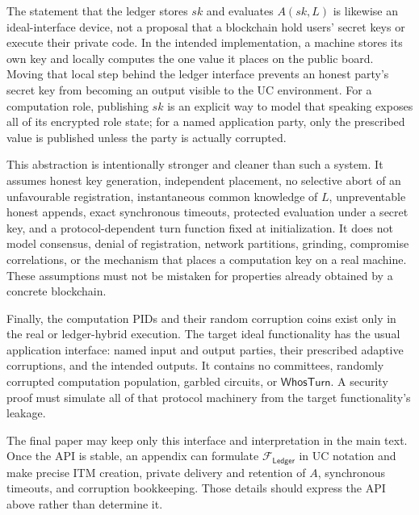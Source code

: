 The statement that the ledger stores $sk$ and evaluates $A(sk,L)$ is likewise
an ideal-interface device, not a proposal that a blockchain hold users' secret
keys or execute their private code. In the intended implementation, a machine
stores its own key and locally computes the one value it places on the public
board. Moving that local step behind the ledger interface prevents an honest
party's secret key from becoming an output visible to the UC environment. For
a computation role, publishing $sk$ is an explicit way to model that speaking
exposes all of its encrypted role state; for a named application party, only
the prescribed value is published unless the party is actually corrupted.

This abstraction is intentionally stronger and cleaner than such a system.
It assumes honest key generation, independent placement, no selective abort
of an unfavourable registration, instantaneous common knowledge of $L$,
unpreventable honest appends, exact synchronous timeouts, protected
evaluation under a secret key, and a protocol-dependent turn function fixed
at initialization. It does not model consensus, denial of registration, network
partitions, grinding, compromise correlations, or the mechanism that places
a computation key on a real machine. These assumptions must not be mistaken
for properties already obtained by a concrete blockchain.

Finally, the computation PIDs and their random corruption coins exist only in
the real or ledger-hybrid execution. The target ideal functionality has the
usual application interface: named input and output parties, their prescribed
adaptive corruptions, and the intended outputs. It contains no committees,
randomly corrupted computation population, garbled circuits, or
$\mathsf{WhosTurn}$. A security proof must simulate all of that protocol
machinery from the target functionality's leakage.

The final paper may keep only this interface and interpretation in the main
text. Once the API is stable, an appendix can formulate
$\mathcal F_{\mathsf{Ledger}}$ in UC notation and make precise ITM creation,
private delivery and retention of $A$, synchronous timeouts, and corruption
bookkeeping. Those details should express the API above rather than determine
it.
